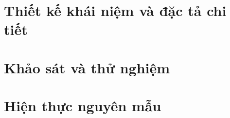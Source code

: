 \chapter{Thiết kế khái niệm và đặc tả chi tiết}

\chapter{Khảo sát và thử nghiệm}
\chapter{Hiện thực nguyên mẫu}
